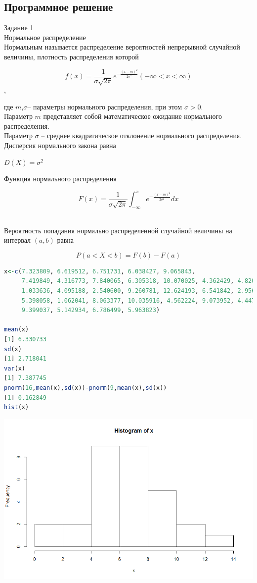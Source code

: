 \subsection{Программное решение}
Задание 1\\
Нормальное распределение\\
Нормальным называется распределение вероятностей непрерывной
случайной величины, плотность распределения которой
\begin{center}
$$f(x)=\frac{1}{\sigma\sqrt{2\pi}}e^{-\frac{(x-m)^2}{2\sigma^2}} (-\infty<x<\infty)$$,\\
\end{center}
где $m$,$\sigma$– параметры нормального распределения, при этом $\sigma>0$.\\
Параметр $m$ представляет собой математическое ожидание нормального распределения.\\
Параметр $\sigma$ – среднее квадратическое отклонение нормального распределения.\\
Дисперсия нормального закона равна
\begin{center}
$D(X)=\sigma^2$\\
\end{center}
Функция нормального распределения
\begin{center}
$$F(x)=\frac{1}{\sigma\sqrt{2\pi}}\int_{-\infty}^{x}e^{-\frac{(x-m)^2}{2\sigma^2}}dx$$\\
\end{center}
Вероятность попадания нормально распределенной случайной величины на интервал $(a,b)$ равна
\begin{center}
$$P(a < X < b) = F(b) − F(a)$$
\end{center}
\newpage
\begin{lstlisting}[language=R,basicstyle=\normalsize]
x<-c(7.323809, 6.619512, 6.751731, 6.038427, 9.065843,
     7.419849, 4.316773, 7.840065, 6.305318, 10.070025, 4.362429, 4.820292,
     1.033636, 4.095188, 2.540600, 9.260781, 12.624193, 6.541842, 2.956328,
     5.398058, 1.062041, 8.063377, 10.035916, 4.562224, 9.073952, 4.447496,
     9.399037, 5.142934, 6.786499, 5.963823)

mean(x)
[1] 6.330733
sd(x)
[1] 2.718041
var(x)
[1] 7.387745
pnorm(16,mean(x),sd(x))-pnorm(9,mean(x),sd(x))
[1] 0.162849
hist(x)
\end{lstlisting}
\includegraphics[scale=0.5]{Hist1.png}\\
